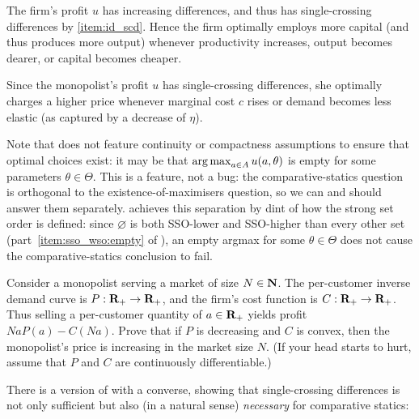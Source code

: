 \begin{namedthm}[\Cref*{example:prod} {\normalfont (continued)}.]
	\label{example:prod_mcs}
	The firm's profit $u$ has increasing differences, and thus has single-crossing differences by \ref{item:id_scd}. Hence the firm optimally employs more capital (and thus produces more output) whenever productivity increases, output becomes dearer, or capital becomes cheaper.
\end{namedthm}

\begin{namedthm}
	\label{example:monopoly_mcs}
	Since the monopolist's profit $u$ has single-crossing differences, she optimally charges a higher price whenever marginal cost $c$ rises or demand becomes less elastic (as captured by a decrease of $\eta$).
\end{namedthm}

Note that  does not feature continuity or compactness assumptions to ensure that optimal choices exist: it may be that $\operatorname*{arg\,max}_{a \in A} u(a,\theta)$ is empty for some parameters $\theta \in \Theta$. This is a feature, not a bug: the comparative-statics question is orthogonal to the existence-of-maximisers question, so we can and should answer them separately.  achieves this separation by dint of how the strong set order is defined: since $\varnothing$ is both SSO-lower and SSO-higher than every other set (part~\ref{item:sso_wso:empty} of ), an empty argmax for some $\theta \in \Theta$ does not cause the comparative-statics conclusion to fail.

\begin{exercise}
	\label{exercise:market_size}
	Consider a monopolist serving a market of size $N \in \mathbf{N}$. The per-customer inverse demand curve is $P : \mathbf{R}_+ \to \mathbf{R}_+$, and the firm's cost function is $C : \mathbf{R}_+ \to \mathbf{R}_+$. Thus selling a per-customer quantity of $a \in \mathbf{R}_+$ yields profit $N aP(a) - C(N a)$. Prove that if $P$ is decreasing and $C$ is convex, then the monopolist's price is increasing in the market size $N$. (If your head starts to hurt, assume that $P$ and $C$ are continuously differentiable.)
\end{exercise}

There is a version of  with a converse, showing that single-crossing differences is not only sufficient but also (in a natural sense) \emph{necessary} for comparative statics:

